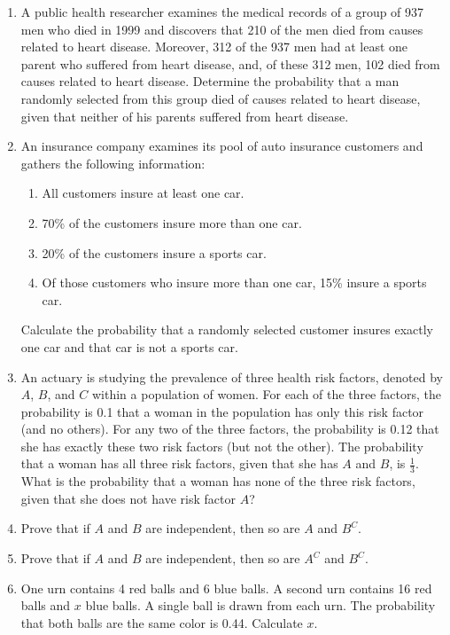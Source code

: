 \documentclass[../main.tex]{subfiles}
\begin{document}
{\begin{enumerate}
	\item A public health researcher examines the medical records of a group of 937
	men who died in 1999 and discovers that 210 of the men died from causes
	related to heart disease. Moreover, 312 of the 937 men had at least one
	parent who suffered from heart disease, and, of these 312 men, 102 died from
	causes related to heart disease.
	Determine the probability that a man randomly selected from this group died
	of causes related to heart disease, given that neither of his parents suffered
	from heart disease.
	
	\item An insurance company examines its pool of auto insurance customers and
	gathers the following information:
	\begin{enumerate}
		\item All customers insure at least one car.
		\item  70\% of the customers insure more than one car.
		\item  20\% of the customers insure a sports car.
		\item Of those customers who insure more than one car, 15\% insure a sports car.
	\end{enumerate}
	Calculate the probability that a randomly selected customer insures exactly
	one car and that car is not a sports car.


	\item An actuary is studying the prevalence of three health risk factors, denoted
	by $A$, $B$, and $C$ within a population of women. For each of the three factors,
	the probability is 0.1 that a woman in the population has only this risk factor
	(and no others). For any two of the three factors, the probability is 0.12 that
	she has exactly these two risk factors (but not the other). The probability
	that a woman has all three risk factors, given that she has $A$ and $B$, is 
	$\frac13$.
	What is the probability that a woman has none of the three risk factors,
	given that she does not have risk factor $A$?
	
	\item Prove that if $A$ and $B$ are independent, then so are $A$ and $B^C$.
	
	\item Prove that if $A$ and $B$ are independent, then so are $A^C$ and $B^C$.
	
	\item One urn contains 4 red balls and 6 blue balls. A second urn contains 16 red
	balls and $x$ blue balls. A single ball is drawn from each urn. The probability
	that both balls are the same color is 0.44.
	Calculate $x$.
	

\end{enumerate}}
\end{document}
